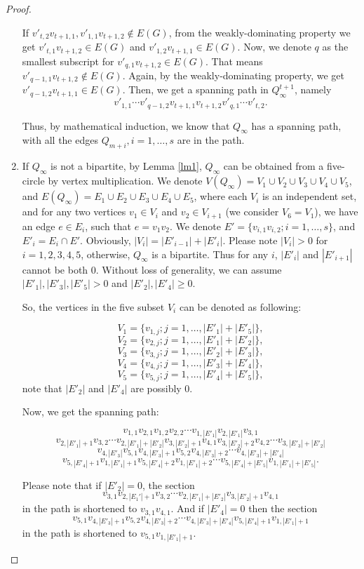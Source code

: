 \documentclass{amsart}
\begin{document}
\begin{proof}
\begin{enumerate}
If $v'_{t,2}v_{t+1,1},v'_{1,1}v_{t+1,2}\not\in E(G)$, from the weakly-dominating property we get $v'_{t,1}v_{t+1,2}\in E(G)$ and $v'_{1,2}v_{t+1,1}\in E(G)$. Now, we denote $q$ as the smallest subscript for $v'_{q,1}v_{t+1,2}\in E(G)$. That means $v'_{q-1,1}v_{t+1,2}\not\in E(G)$. Again, by the weakly-dominating property, we get $v'_{q-1,2}v_{t+1,1}\in E(G)$. Then, we get a spanning path in $Q^{t+1}_{\infty}$, namely $$v'_{1,1}\cdots v'_{q-1,2}v_{t+1,1}v_{t+1,2}v'_{q,1}\cdots v'_{t,2}.$$

Thus, by mathematical induction, we know that $Q_{\infty}$ has a spanning path, with all the edges $Q_{m+i},i=1,\ldots,s$ are in the path.

\item If $Q_{\infty}$ is not a bipartite, by Lemma \ref{lm1}, $Q_{\infty}$ can be obtained from a five-circle by vertex multiplication. We denote $V(Q_{\infty})=V_1\cup V_2\cup V_3\cup V_4\cup V_5$, and $E(Q_{\infty})=E_1\cup E_2\cup E_3\cup E_4\cup E_5$, where each $V_i$ is an independent set, and  for any two vertices $v_1\in V_i$ and $v_2\in V_{i+1}$ (we consider $V_6=V_1$), we have an edge $e\in E_i$, such that $e=v_1v_2$. We denote $E'=\{v_{i,1}v_{i,2};i=1,\ldots,s\}$, and $E'_i=E_i\cap E'$. Obviously, $|V_i|=|E'_{i-1}|+|E'_i|$. Please note $|V_i|>0$ for $i=1,2,3,4,5$, otherwise, $Q_{\infty}$ is a bipartite. Thus for any $i$, $|E'_i|$ and $|E'_{i+1}|$ cannot be both 0. Without loss of generality, we can assume $|E'_1|,|E'_3|,|E'_5|>0$ and $|E'_2|,|E'_4|\ge0$.

 So, the vertices in the five subset $V_i$ can be denoted as following:

$$V_1=\{v_{1,j};j=1,\ldots,|E'_1|+|E'_5|\},$$
$$V_2=\{v_{2,j};j=1,\ldots,|E'_1|+|E'_2|\},$$
$$V_3=\{v_{3,j};j=1,\ldots,|E'_2|+|E'_3|\},$$
$$V_4=\{v_{4,j};j=1,\ldots,|E'_3|+|E'_4|\},$$
$$V_5=\{v_{5,j};j=1,\ldots,|E'_4|+|E'_5|\},$$
note that $|E'_2|$ and $|E'_4|$ are possibly 0.

Now, we get the spanning path:

$$v_{1,1}v_{2,1}v_{1,2}v_{2,2}\cdots v_{1,|E'_1|}v_{2,|E'_1|}v_{3,1}$$
$$v_{2,|E'_1|+1}v_{3,2}\cdots v_{2,|E'_1|+|E'_2|}v_{3,|E'_2|+1}v_{4,1}v_{3,|E'_2|+2}v_{4,2}\cdots v_{3,|E'_3|+|E'_2|}$$
$$v_{4,|E'_3|}v_{5,1}v_{4,|E'_3|+1}v_{5,2}v_{4,|E'_3|+2}\cdots v_{4,|E'_3|+|E'_4|}$$
$$v_{5,|E'_4|+1}v_{1,|E'_1|+1}v_{5,|E'_4|+2}v_{1,|E'_1|+2}\cdots v_{5,|E'_4|+|E'_5|}v_{1,|E'_1|+|E'_5|}.$$

Please note that if $|E'_2|=0$, the section $$v_{3,1}v_{2,|E_1'|+1}v_{3,2}\cdots v_{2,|E'_1|+|E'_2|}v_{3,|E'_2|+1}v_{4,1}$$ in the path is shortened to $v_{3,1}v_{4,1}$. And if $|E'_4|=0$ then the section $$v_{5,1}v_{4,|E'_3|+1}v_{5,2}v_{4,|E'_3|+2}\cdots v_{4,|E'_3|+|E'_4|}v_{5,|E'_4|+1}v_{1,|E'_1|+1}$$ in the path is shortened to $v_{5,1}v_{1,|E'_1|+1}$.
\end{enumerate}\end{proof}
\end{document}

